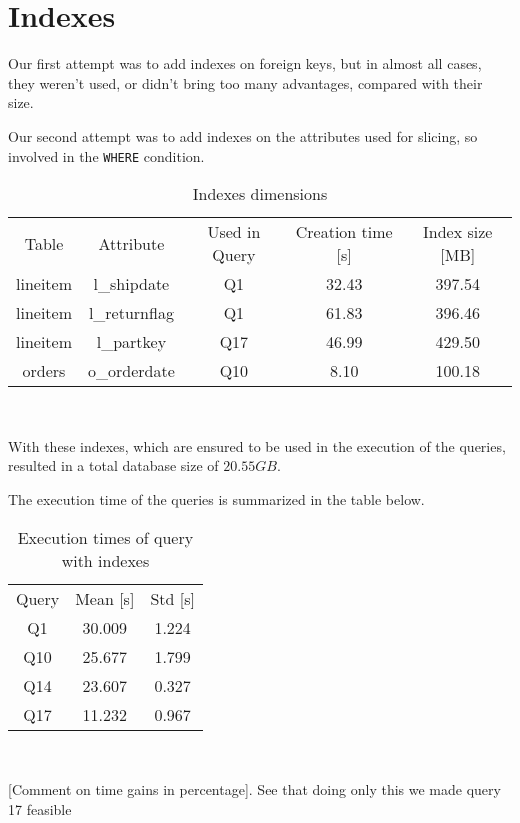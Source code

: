 \section{Indexes}

Our first attempt was to add indexes on foreign keys, but in almost all cases, they weren't used, or didn't bring too many advantages, compared with their size.

Our second attempt was to add indexes on the attributes used for slicing, so involved in the \verb|WHERE| condition.

\begin{table}[H]
\centering
\begin{tabular}{c|c|c|c|c}
\rowcolor{blue!50} Table    & Attribute     & Used in Query & Creation time [s] & Index size [MB]\\
\rowcolor{gray!10} lineitem & l\_shipdate   & Q1            & 32.43             & 397.54 \\ 
\rowcolor{white}   lineitem & l\_returnflag & Q1            & 61.83             & 396.46 \\ 
\rowcolor{gray!10} lineitem & l\_partkey    & Q17           & 46.99             & 429.50 \\ 
\rowcolor{white}   orders   & o\_orderdate  & Q10           & 8.10              &  100.18      \\ 
\end{tabular}\\[0.5cm]
    \caption{Indexes dimensions}
\end{table}

With these indexes, which are ensured to be used in the execution of the queries, resulted in a total database size of $20.55 GB$.

The execution time of the queries is summarized in the table below.

\begin{table}[H]
\centering
\begin{tabular}{c|c|c}
\rowcolor{blue!50} Query  & Mean [s] & Std [s] \\
\rowcolor{gray!10} Q1     & 30.009   &1.224    \\
\rowcolor{white}   Q10    & 25.677   &1.799    \\
\rowcolor{gray!10} Q14    & 23.607   &0.327    \\
\rowcolor{white}   Q17    & 11.232   &0.967    \\
\end{tabular}\\[0.5cm]
    \caption{Execution times of query with indexes}
    \label{tab:idx_exec_time}
\end{table}


[Comment on time gains in percentage]. See that doing only this we made query 17 feasible